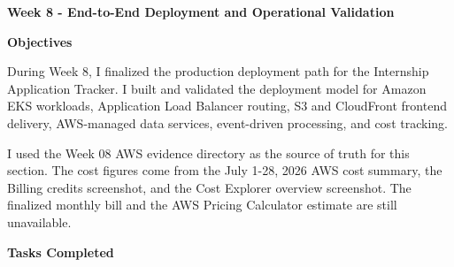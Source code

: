 \vspace{0.5em}\noindent\textbf{Week 8 - End-to-End Deployment and Operational
Validation}\par

\vspace{0.5em}\noindent\textbf{Objectives}\par

During Week 8, I finalized the production deployment path for the
Internship Application Tracker. I built and validated the deployment
model for Amazon EKS workloads, Application Load Balancer routing, S3
and CloudFront frontend delivery, AWS-managed data services,
event-driven processing, and cost tracking.

I used the Week 08 AWS evidence directory as the source of truth for
this section. The cost figures come from the July 1-28, 2026 AWS cost
summary, the Billing credits screenshot, and the Cost Explorer overview
screenshot. The finalized monthly bill and the AWS Pricing Calculator
estimate are still unavailable.

\vspace{0.5em}\noindent\textbf{Tasks Completed}\par

